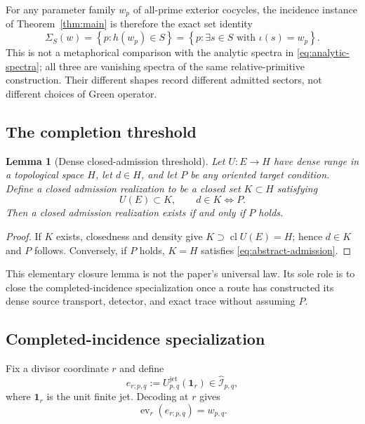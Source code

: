 \documentclass[11pt]{article}
\newtheorem{lemma}[theorem]{Lemma}
\theoremstyle{definition}
\theoremstyle{remark}
\newcommand{\cI}{\mathcal I}
\newcommand{\cl}{\operatorname{cl}}
\begin{document}
For any parameter family \(w_p\) of all-prime exterior cocycles, the
incidence instance of Theorem~\ref{thm:main} is therefore the exact set
identity
\[
 \Sigma_S(w)=
 \left\{p:h(w_p)\in S\right\}
 =\left\{p:\exists s\in S\text{ with }\iota(s)=w_p\right\}.
\tag{5.J}\label{eq:deninger-spectrum}
\]
This is not a metaphorical comparison with the analytic spectra in
\eqref{eq:analytic-spectra}; all three are vanishing spectra of the same
relative-primitive construction.  Their different shapes record different
admitted sectors, not different choices of Green operator.

\subsection{The completion threshold}

\begin{lemma}[Dense closed-admission threshold]
\label{thm:dense-admission}
Let \(U:E\to H\) have dense range in a topological space \(H\), let
\(d\in H\), and let \(P\) be any oriented target condition.  Define a
closed admission realization to be a closed set \(K\subset H\) satisfying
\[
                U(E)\subset K,\qquad d\in K\Longleftrightarrow P.
\tag{5.5}\label{eq:abstract-admission}
\]
Then a closed admission realization exists if and only if \(P\) holds.
\end{lemma}

\begin{proof}
If \(K\) exists, closedness and density give
\(K\supset\cl U(E)=H\); hence \(d\in K\) and \(P\) follows.  Conversely,
if \(P\) holds, \(K=H\) satisfies \eqref{eq:abstract-admission}.
\end{proof}

This elementary closure lemma is not the paper's universal law.  Its sole
role is to close the completed-incidence specialization once a route has
constructed its dense source transport, detector, and exact trace without
assuming \(P\).

\subsection{Completed-incidence specialization}

Fix a divisor coordinate \(r\) and define
\[
 e_{r;p,q}:=U^{\mathrm{jet}}_{p,q}(\mathbf1_r)
             \in\widehat{\cI}_{p,q},
\tag{5.6}\label{eq:canonical-vector}
\]
where \(\mathbf1_r\) is the unit finite jet.  Decoding at \(r\) gives
\[
                  \operatorname{ev}_r(e_{r;p,q})=w_{p,q}.
\tag{5.7}\label{eq:canonical-decodes}
\]
\end{document}
